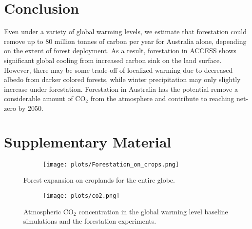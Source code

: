 \documentclass[]{article}
\begin{document}
\section{Conclusion}

Even under a variety of global warming levels, we estimate that forestation could remove up to 80 million tonnes of carbon per year for Australia alone, depending on the extent of forest deployment.
As a result, forestation in ACCESS shows significant global cooling from increased carbon sink on the land surface.
However, there may be some trade-off of localized warming due to decreased albedo from darker colored forests, while winter precipitation may only slightly increase under forestation.
Forestation in Australia has the potential remove a considerable amount of CO$_2$ from the atmosphere and contribute to reaching net-zero by 2050.


\printbibliography

\section{Supplementary Material}
\setcounter{figure}{0}

\begin{figure}[H]
    \centering
    \begin{subfigure}[b]{\linewidth}
        \texttt{[image: plots/Forestation\_on\_crops.png]}
    \end{subfigure}
    \caption{Forest expansion on croplands for the entire globe.}
    \label{fig:global_forestation}
\end{figure}

\begin{figure}[H]
    \centering
    \begin{subfigure}[b]{\linewidth}
        \texttt{[image: plots/co2.png]}
    \end{subfigure}
    \caption{Atmospheric CO$_2$ concentration in the global warming level baseline simulations and the forestation experiments.}
    \label{fig:atmospheric_co2}
\end{figure}
\end{document}
